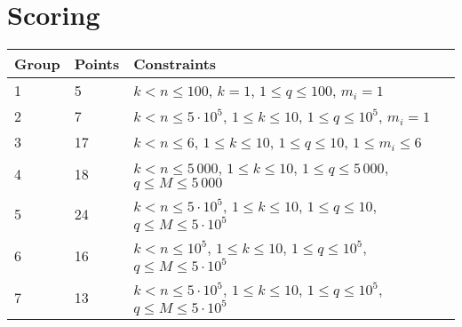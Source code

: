 \section*{Scoring}
\begin{tabular}{|l|l|l|}
    \hline
    Group & Points & Constraints \\ \hline
    1     & 5      & $k < n \leq 100$,           $k = 1$,            $1 \leq q \leq 100$,  $m_i = 1$ \\ \hline %
    2     & 7      & $k < n \leq 5 \cdot 10^5$,  $1 \leq k \leq 10$, $1 \leq q \leq 10^5$, $m_i = 1$ \\ \hline %
    3     & 17     & $k < n \leq 6$,             $1 \leq k \leq 10$, $1 \leq q \leq 10$,   $1 \leq m_i \leq 6$  \\ \hline %
    4     & 18     & $k < n \leq 5\,000$,        $1 \leq k \leq 10$, $1 \leq q \leq 5\,000$, $q \leq M \leq 5\,000$ \\ \hline %
    5     & 24     & $k < n \leq 5 \cdot 10^5$,  $1 \leq k \leq 10$, $1 \leq q \leq 10$,   $q \leq M \leq 5 \cdot 10^5$ \\ \hline %
    6     & 16     & $k < n \leq 10^5$,          $1 \leq k \leq 10$, $1 \leq q \leq 10^5$, $q \leq M \leq 5 \cdot 10^5$ \\ \hline %
    7     & 13     & $k < n \leq 5 \cdot 10^5$,  $1 \leq k \leq 10$, $1 \leq q \leq 10^5$, $q \leq M \leq 5 \cdot 10^5$ \\ \hline %
\end{tabular}

